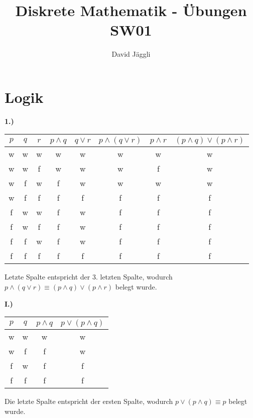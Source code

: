 \documentclass[12pt]{scrartcl}
\author{David Jäggli}
\title{Diskrete Mathematik - Übungen SW01}
\begin{document}
\maketitle

\tableofcontents

\newpage
\section{Logik}
\textbf{1.)}
\begin{center}
    \begin{tabular}{ c | c | c | c | c | c | c | c }
        $p$ & $q$ & $r$ & $p \land q$ & $q \lor r$ & $p \land (q \lor r)$ & $p \land r$ & $(p \land q) \lor (p \land r)$\\ 
        \hline
        w & w & w & w & w & w & w & w \\ 
        w & w & f & w & w & w & f & w \\ 
        w & f & w & f & w & w & w & w \\ 
        w & f & f & f & f & f & f & f \\ 
        f & w & w & f & w & f & f & f \\ 
        f & w & f & f & w & f & f & f \\ 
        f & f & w & f & w & f & f & f \\ 
        f & f & f & f & f & f & f & f \\ 
    \end{tabular}
\end{center}

Letzte Spalte entspricht der 3. letzten Spalte, wodurch 
$p \land (q \lor r) \equiv (p \land q) \lor (p \land r)$
belegt wurde.

\vspace{50px}
\textbf{I.)}
\begin{center}
    \begin{tabular}{ c | c | c | c }
        $p$ & $q$ & $p \land q$ & $p \lor (p \land q)$\\ 
        \hline
        w & w & w & w \\ 
        w & f & f & w \\ 
        f & w & f & f \\ 
        f & f & f & f \\ 
    \end{tabular}
\end{center}

Die letzte Spalte entspricht der ersten Spalte, wodurch 
$p \lor (p \land q) \equiv p$ 
belegt wurde.
\end{document}
